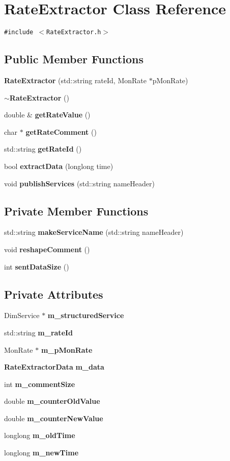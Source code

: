 \section{Rate\-Extractor Class Reference}
\label{classRateExtractor}
{\tt \#include $<$Rate\-Extractor.h$>$}

\subsection*{Public Member Functions}
\begin{CompactItemize}
\item 
{\bf Rate\-Extractor} (std::string rate\-Id, Mon\-Rate $\ast$p\-Mon\-Rate)
\item 
{\bf $\sim$Rate\-Extractor} ()
\item 
double \& {\bf get\-Rate\-Value} ()
\item 
char $\ast$ {\bf get\-Rate\-Comment} ()
\item 
std::string {\bf get\-Rate\-Id} ()
\item 
bool {\bf extract\-Data} (longlong time)
\item 
void {\bf publish\-Services} (std::string name\-Header)
\end{CompactItemize}
\subsection*{Private Member Functions}
\begin{CompactItemize}
\item 
std::string {\bf make\-Service\-Name} (std::string name\-Header)
\item 
void {\bf reshape\-Comment} ()
\item 
int {\bf sent\-Data\-Size} ()
\end{CompactItemize}
\subsection*{Private Attributes}
\begin{CompactItemize}
\item 
Dim\-Service $\ast$ {\bf m\_\-structured\-Service}
\item 
std::string {\bf m\_\-rate\-Id}
\item 
Mon\-Rate $\ast$ {\bf m\_\-p\-Mon\-Rate}
\item 
{\bf Rate\-Extractor\-Data} {\bf m\_\-data}
\item 
int {\bf m\_\-comment\-Size}
\item 
double {\bf m\_\-counter\-Old\-Value}
\item 
double {\bf m\_\-counter\-New\-Value}
\item 
longlong {\bf m\_\-old\-Time}
\item 
longlong {\bf m\_\-new\-Time}
\end{CompactItemize}
